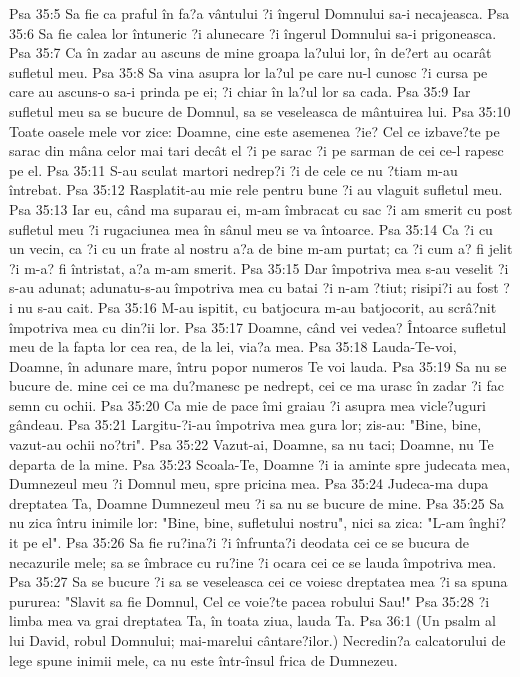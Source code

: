 Psa 35:5  Sa fie ca praful în fa?a vântului ?i îngerul Domnului sa-i necajeasca.
Psa 35:6  Sa fie calea lor întuneric ?i alunecare ?i îngerul Domnului sa-i prigoneasca.
Psa 35:7  Ca în zadar au ascuns de mine groapa la?ului lor, în de?ert au ocarât sufletul meu.
Psa 35:8  Sa vina asupra lor la?ul pe care nu-l cunosc ?i cursa pe care au ascuns-o sa-i prinda pe ei; ?i chiar în la?ul lor sa cada.
Psa 35:9  Iar sufletul meu sa se bucure de Domnul, sa se veseleasca de mântuirea lui.
Psa 35:10  Toate oasele mele vor zice: Doamne, cine este asemenea ?ie? Cel ce izbave?te pe sarac din mâna celor mai tari decât el ?i pe sarac ?i pe sarman de cei ce-l rapesc pe el.
Psa 35:11  S-au sculat martori nedrep?i ?i de cele ce nu ?tiam m-au întrebat.
Psa 35:12  Rasplatit-au mie rele pentru bune ?i au vlaguit sufletul meu.
Psa 35:13  Iar eu, când ma suparau ei, m-am îmbracat cu sac ?i am smerit cu post sufletul meu ?i rugaciunea mea în sânul meu se va întoarce.
Psa 35:14  Ca ?i cu un vecin, ca ?i cu un frate al nostru a?a de bine m-am purtat; ca ?i cum a? fi jelit ?i m-a? fi întristat, a?a m-am smerit.
Psa 35:15  Dar împotriva mea s-au veselit ?i s-au adunat; adunatu-s-au împotriva mea cu batai ?i n-am ?tiut; risipi?i au fost ?i nu s-au cait.
Psa 35:16  M-au ispitit, cu batjocura m-au batjocorit, au scrâ?nit împotriva mea cu din?ii lor.
Psa 35:17  Doamne, când vei vedea? Întoarce sufletul meu de la fapta lor cea rea, de la lei, via?a mea.
Psa 35:18  Lauda-Te-voi, Doamne, în adunare mare, întru popor numeros Te voi lauda.
Psa 35:19  Sa nu se bucure de. mine cei ce ma du?manesc pe nedrept, cei ce ma urasc în zadar ?i fac semn cu ochii.
Psa 35:20  Ca mie de pace îmi graiau ?i asupra mea vicle?uguri gândeau.
Psa 35:21  Largitu-?i-au împotriva mea gura lor; zis-au: "Bine, bine, vazut-au ochii no?tri".
Psa 35:22  Vazut-ai, Doamne, sa nu taci; Doamne, nu Te departa de la mine.
Psa 35:23  Scoala-Te, Doamne ?i ia aminte spre judecata mea, Dumnezeul meu ?i Domnul meu, spre pricina mea.
Psa 35:24  Judeca-ma dupa dreptatea Ta, Doamne Dumnezeul meu ?i sa nu se bucure de mine.
Psa 35:25  Sa nu zica întru inimile lor: "Bine, bine, sufletului nostru", nici sa zica: "L-am înghi?it pe el".
Psa 35:26  Sa fie ru?ina?i ?i înfrunta?i deodata cei ce se bucura de necazurile mele; sa se îmbrace cu ru?ine ?i ocara cei ce se lauda împotriva mea.
Psa 35:27  Sa se bucure ?i sa se veseleasca cei ce voiesc dreptatea mea ?i sa spuna pururea: "Slavit sa fie Domnul, Cel ce voie?te pacea robului Sau!"
Psa 35:28  ?i limba mea va grai dreptatea Ta, în toata ziua, lauda Ta.
Psa 36:1  (Un psalm al lui David, robul Domnului; mai-marelui cântare?ilor.) Necredin?a calcatorului de lege spune inimii mele, ca nu este într-însul frica de Dumnezeu.
